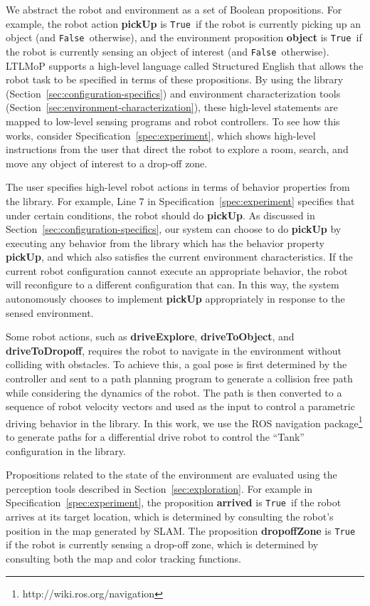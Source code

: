 \documentclass[conference]{IEEEtran}
\newcommand{\lt}{{\tt True }}
\newcommand{\lf}{{\tt False }}
\begin{document}
We abstract the robot and environment as a set of Boolean propositions.
For example, the robot action \textbf{pickUp} is \lt if the robot is currently picking up an object (and \lf otherwise), and the environment proposition \textbf{object} is \lt if the robot is currently sensing an object of interest (and \lf otherwise).
LTLMoP supports a high-level language called Structured English that allows the robot task to be specified in terms of these propositions.
By using the library (Section~\ref{sec:configuration-specifics})  and environment characterization tools (Section~\ref{sec:environment-characterization}), these high-level statements are mapped to low-level sensing programs and robot controllers.
To see how this works, consider Specification~\ref{spec:experiment}, which shows  high-level instructions from the user that direct the robot to explore a room, search, and move any object of interest to a drop-off zone.

The user specifies high-level robot actions in terms of behavior properties from the library.  For example, Line 7 in Specification~\ref{spec:experiment} specifies that under certain conditions, the robot should do \textbf{pickUp}.  As discussed in Section~\ref{sec:configuration-specifics}, our system can choose to do \textbf{pickUp} by executing any behavior from the library which has the behavior property \textbf{pickUp}, and which also satisfies the current environment characteristics. If the current robot configuration cannot execute an appropriate behavior, the robot will reconfigure to a different configuration that can.  In this way, the system autonomously chooses to implement  \textbf{pickUp}  appropriately in response to the sensed environment.

Some robot actions, such as \textbf{driveExplore}, \textbf{driveToObject}, and \textbf{driveToDropoff}, requires the robot to navigate in the environment without colliding with obstacles.
To achieve this, a goal pose is first determined by the controller and sent to a path planning program to generate a collision free path while considering the dynamics of the robot.
The path is then converted to a sequence of robot velocity vectors and used as the input to control a parametric driving behavior in the library.
In this work, we use the ROS navigation package\footnote{http://wiki.ros.org/navigation} to generate paths for a differential drive robot to control the ``Tank'' configuration in the library.

Propositions related to the state of the environment are evaluated using the perception tools described in Section~\ref{sec:exploration}. For example in Specification~\ref{spec:experiment}, the proposition \textbf{arrived} is \lt if the robot arrives at its target location, which is determined by consulting the robot's position in the map generated by SLAM. The proposition \textbf{dropoffZone} is \lt if the robot is currently sensing a drop-off zone, which is determined by consulting both the map and color tracking functions.
\end{document}
